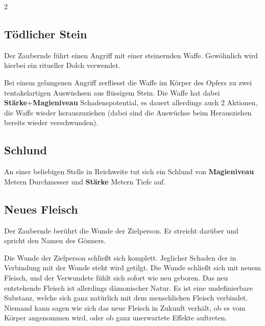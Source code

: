 \begin{multicols*}{2}


\subsection{Tödlicher Stein}

Der Zaubernde führt einen Angriff mit einer steinernden Waffe. Gewöhnlich wird hierbei ein ritueller Dolch verwendet.

Bei einem gelungenen Angriff zerfliesst die Waffe im Körper des Opfers zu zwei tentakelartigen Auswüchsen aus flüssigem Stein. Die Waffe hat dabei \textbf{Stärke}+\textbf{Magieniveau} Schadenspotential, es dauert allerdings auch 2 Aktionen, die Waffe wieder herauszuziehen (dabei sind die Auswüchse beim Herausziehen bereits wieder verschwunden).



\subsection{Schlund}

An einer beliebigen Stelle in Reichweite tut sich ein Schlund von \textbf{Magieniveau} Metern Durchmesser und \textbf{Stärke} Metern Tiefe auf.



\subsection{Neues Fleisch}

Der Zaubernde berührt die Wunde der Zielperson. Er streicht darüber und spricht den Namen des Gönners.

Die Wunde der Zielperson schließt sich komplett. Jeglicher Schaden der in Verbindung mit der Wunde steht wird getilgt. Die Wunde schließt sich mit neuem Fleisch, und der Verwundete fühlt sich sofort wie neu geboren. Das neu entstehende Fleisch ist allerdings dämonischer Natur. Es ist eine undefinierbare Substanz, welche sich ganz natürlich mit dem menschlichen Fleisch verbindet. Niemand kann sagen wie sich das neue Fleisch in Zukunft verhält, ob es vom Körper angenommen wird, oder ob ganz unerwartete Effekte auftreten.


\end{multicols*}
